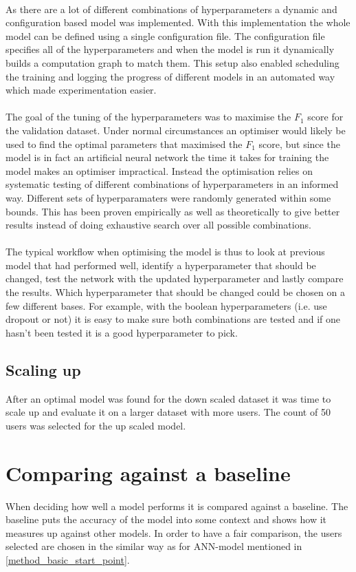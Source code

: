 \\
As there are a lot of different combinations of hyperparameters a dynamic and configuration based model was implemented. With this implementation the whole model can be defined using a single configuration file. The configuration file specifies all of the hyperparameters and when the model is run it dynamically builds a computation graph to match them. This setup also enabled scheduling the training and logging the progress of different models in an automated way which made experimentation easier.
\\\\
The goal of the tuning of the hyperparameters was to maximise the $F_1$ score for the validation dataset. Under normal circumstances an optimiser would likely be used to find the optimal parameters that maximised the $F_1$ score, but since the model is in fact an artificial neural network the time it takes for training the model makes an optimiser impractical. Instead the optimisation relies on systematic testing of different combinations of hyperparameters in an informed way. Different sets of hyperparamaters were randomly generated within some bounds. This has been proven empirically as well as theoretically to give better results instead of doing exhaustive search over all possible combinations. \parencite{bergstra2012random}
\\\\
The typical workflow when optimising the model is thus to look at previous model that had performed well, identify a hyperparameter that should be changed, test the network with the updated hyperparameter and lastly compare the results. Which hyperparameter that should be changed could be chosen on a few different bases. For example, with the boolean hyperparameters (i.e. use dropout or not) it is easy to make sure both combinations are tested and if one hasn't been tested it is a good hyperparameter to pick.
\subsection{Scaling up}
After an optimal model was found for the down scaled dataset it was time to scale up and evaluate it on a larger dataset with more users. The count of 50 users was selected for the up scaled model. 
\section{Comparing against a baseline}
When deciding how well a model performs it is compared against a baseline. The baseline puts the accuracy of the model into some context and shows how it measures up against other models. In order to have a fair comparison, the users selected are chosen in the similar way as for ANN-model mentioned in \ref{method_basic_start_point}. 
